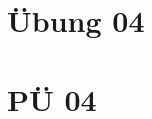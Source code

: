 \documentclass[paper=a4, fontsize=11pt]{scrartcl}
\numberwithin{equation}{section}
\numberwithin{figure}{section}
\numberwithin{table}{section}
\begin{document}

\newpage

\section{Übung 04}


\newpage

\section{PÜ 04}

\end{document}
